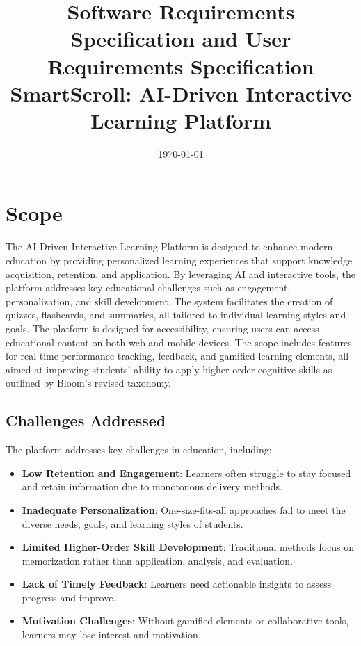 \documentclass[12pt]{article}
\title{Software Requirements Specification  and User Requirements Specification  \\ \textbf{SmartScroll: AI-Driven Interactive Learning Platform}}
\author{}
\date{\today}
\begin{document}
\maketitle

\tableofcontents

\newpage

\section{Scope}
The AI-Driven Interactive Learning Platform is designed to enhance modern education by providing personalized learning experiences that support knowledge acquisition, retention, and application. By leveraging AI and interactive tools, the platform addresses key educational challenges such as engagement, personalization, and skill development. The system facilitates the creation of quizzes, flashcards, and summaries, all tailored to individual learning styles and goals. The platform is designed for accessibility, ensuring users can access educational content on both web and mobile devices. The scope includes features for real-time performance tracking, feedback, and gamified learning elements, all aimed at improving students' ability to apply higher-order cognitive skills as outlined by Bloom's revised taxonomy.

\subsection{Challenges Addressed}
The platform addresses key challenges in education, including:
\begin{itemize}
    \item \textbf{Low Retention and Engagement}: Learners often struggle to stay focused and retain information due to monotonous delivery methods.
    \item \textbf{Inadequate Personalization}: One-size-fits-all approaches fail to meet the diverse needs, goals, and learning styles of students.
    \item \textbf{Limited Higher-Order Skill Development}: Traditional methods focus on memorization rather than application, analysis, and evaluation.
    \item \textbf{Lack of Timely Feedback}: Learners need actionable insights to assess progress and improve.
    \item \textbf{Motivation Challenges}: Without gamified elements or collaborative tools, learners may lose interest and motivation.
\end{itemize}
\end{document}
